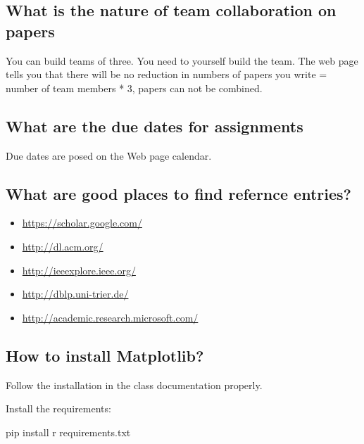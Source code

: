 \subsection{What is the nature of team collaboration on papers}
\label{\detokenize{faq:id1}}
You can build teams of three. You need to yourself build the team. The
web page tells you that there will be no reduction in numbers of
papers you write = number of team members * 3, papers can not be
combined.


\subsection{What are the due dates for assignments}
\label{\detokenize{faq:what-are-the-due-dates-for-assignments}}
Due dates are posed on the Web page calendar.


\subsection{What are good places to find refernce entries?}
\label{\detokenize{faq:what-are-good-places-to-find-refernce-entries}}\begin{itemize}
\item {} 
\url{https://scholar.google.com/}

\item {} 
\url{http://dl.acm.org/}

\item {} 
\url{http://ieeexplore.ieee.org/}

\item {} 
\url{http://dblp.uni-trier.de/}

\item {} 
\url{http://academic.research.microsoft.com/}

\end{itemize}


\subsection{How to install Matplotlib?}
\label{\detokenize{faq:how-to-install-matplotlib}}
Follow the installation in the class documentation properly.

Install the requirements:

\begin{sphinxVerbatim}[commandchars=\\\{\}]
\PYGZdl{} pip install \PYGZhy{}r requirements.txt
\end{sphinxVerbatim}

